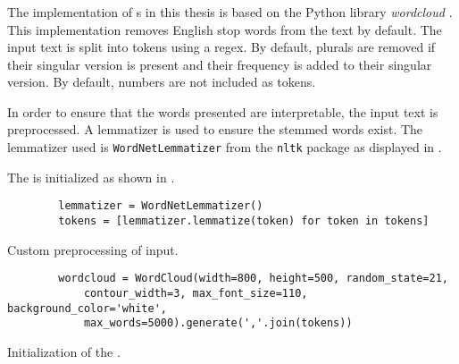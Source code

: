 \subsubsection*{\wordcloud{}}\label{subsubsec:impl-wordcloud}

The implementation of \wordcloud{}s in this thesis is based on the Python library \textit{wordcloud} \cite{wordcloud-dev}.
This implementation removes English stop words from the text by default.
The input text is split into tokens using a regex.
By default, plurals are removed if their singular version is present and their frequency is added to their singular version.
By default, numbers are not included as tokens.

In order to ensure that the words presented are interpretable, the input text is preprocessed.
A lemmatizer is used to ensure the stemmed words exist.
The lemmatizer used is \texttt{WordNetLemmatizer} from the \texttt{nltk} package as displayed in .

The \wordcloud{} is initialized as shown in .

\begin{listing}[htp]
    \begin{verbatim}
        lemmatizer = WordNetLemmatizer()
        tokens = [lemmatizer.lemmatize(token) for token in tokens]
    \end{verbatim}
    \caption[Custom preprocessing of \wordcloud{} input]
    {Custom preprocessing of \wordcloud{} input.
    }
    \label{lst:impl-preproc-wordcloud}
\end{listing}

\begin{listing}[htp]
    \begin{verbatim}
        wordcloud = WordCloud(width=800, height=500, random_state=21, 
            contour_width=3, max_font_size=110, background_color='white', 
            max_words=5000).generate(','.join(tokens))
    \end{verbatim}
    \caption[Initialization of the \wordcloud{}]
    {Initialization of the \wordcloud{}.
    }
    \label{lst:impl-wordcloud}
\end{listing}


